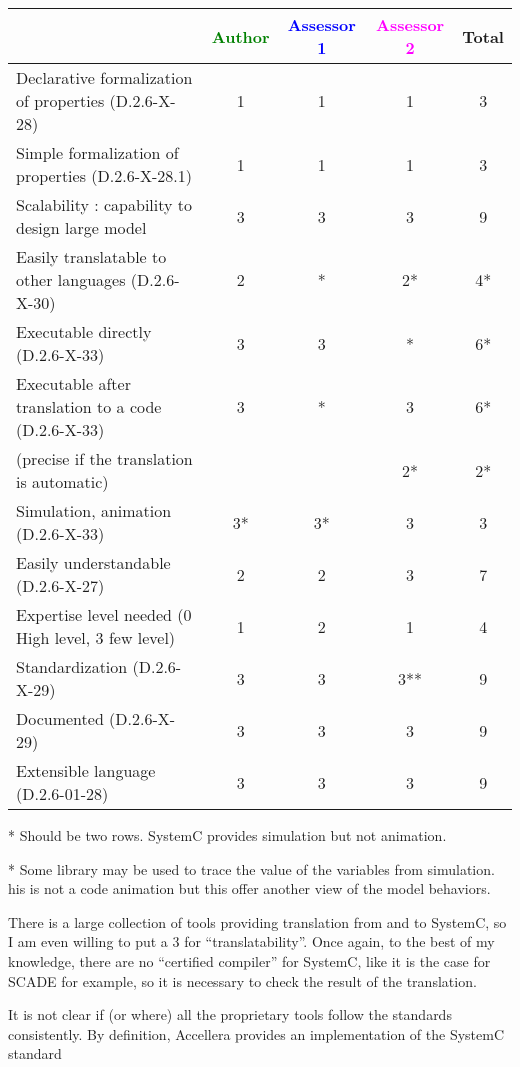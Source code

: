 \begin{tabular}{|l | c | c | c | c|}
  \hline
  & \textcolor{green}{Author} & \textcolor{blue}{Assessor 1} & \textcolor{magenta}{Assessor 2} & Total \\
  \hline
  Declarative formalization of properties (D.2.6-X-28) &1 &1 & 1& 3 \\
  \hline
  Simple formalization of properties (D.2.6-X-28.1) &1 &1 &1 & 3 \\
  \hline
  Scalability : capability to design large model &3 &3 & 3 & 9 \\
  \hline
  Easily translatable to other languages (D.2.6-X-30) & 2 &  * & 2* & 4* \\
  \hline
  Executable directly (D.2.6-X-33) &3 & 3  & * & 6* \\
  \hline
  Executable after translation to a code (D.2.6-X-33) &3 & * &3 & 6* \\
  (precise if the translation is automatic) & & & 2*& 2* \\
  \hline
  Simulation, animation (D.2.6-X-33) &3* &3* &3 & 3 \\
  \hline
  Easily understandable (D.2.6-X-27) &2 &2 &3 & 7 \\
  \hline
  Expertise level needed (0 High level, 3 few level) &1 &2 &1 & 4 \\
  \hline
  Standardization (D.2.6-X-29) &3 &3 &3** & 9 \\
  \hline
  Documented (D.2.6-X-29) &3 &3 &3 & 9 \\
  \hline
  Extensible language (D.2.6-01-28) &3 &3 &3 & 9 \\
  \hline
\end{tabular}

\begin{author_comment}
* Should be two rows. SystemC provides simulation but not animation.
\end{author_comment}
\begin{assessor1}
* Some library may be used to trace the value of  the variables from
simulation. his is not a code animation but this offer another view of
the model behaviors.
\end{assessor1}

\begin{assessor2}
\item[(*)] There is a large collection of tools providing translation
  from and to SystemC, so I am even willing to put a 3 for
  ``translatability''. Once again, to the best of my knowledge, there
  are no ``certified compiler'' for SystemC, like it is the case for
  SCADE for example, so it is necessary to check the result of the
  translation.
\item[(**)] It is not clear if (or where) all the proprietary tools
  follow the standards consistently. By definition, Accellera provides
  an implementation of the SystemC standard 
\end{assessor2}

